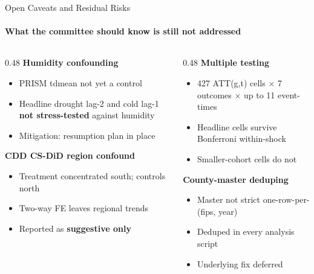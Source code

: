 \documentclass[aspectratio=169,11pt]{beamer}
\newcommand{\emphcolor}[1]{{\color{WarmOrange}\textbf{#1}}}
\newcommand{\tealtext}[1]{{\color{Teal}#1}}
\begin{document}
\begin{frame}{Open Caveats and Residual Risks}
  \framesubtitle{What the committee should know is still not addressed}
  \begin{columns}[T]
    \begin{column}{0.48\textwidth}
      \textbf{\tealtext{Humidity confounding}}
      \begin{itemize}\itemsep0.10em
        \item PRISM tdmean not yet a control
        \item Headline drought lag-2 and cold lag-1 \emphcolor{not stress-tested} against humidity
        \item Mitigation: resumption plan in place
      \end{itemize}
      \vspace{0.25em}
      \textbf{\tealtext{CDD CS-DiD region confound}}
      \begin{itemize}\itemsep0.10em
        \item Treatment concentrated south; controls north
        \item Two-way FE leaves regional trends
        \item Reported as \emphcolor{suggestive only}
      \end{itemize}
    \end{column}
    \begin{column}{0.48\textwidth}
      \textbf{\tealtext{Multiple testing}}
      \begin{itemize}\itemsep0.10em
        \item 427 ATT(g,t) cells \(\times\) 7 outcomes \(\times\) up to 11 event-times
        \item Headline cells survive Bonferroni within-shock
        \item Smaller-cohort cells do not
      \end{itemize}
      \vspace{0.25em}
      \textbf{\tealtext{County-master deduping}}
      \begin{itemize}\itemsep0.10em
        \item Master not strict one-row-per-(fips, year)
        \item Deduped in every analysis script
        \item Underlying fix deferred
      \end{itemize}
    \end{column}
  \end{columns}
\end{frame}
\end{document}
